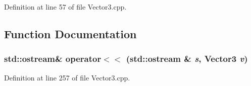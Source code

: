 Definition at line 57 of file Vector3.cpp.



\subsection{Function Documentation}
\subsubsection[{operator$<$$<$}]{\setlength{\rightskip}{0pt plus 5cm}std::ostream\& operator$<$$<$ (std::ostream \& {\em s}, \/  {\bf Vector3} {\em v})}\label{Vector3_8cpp_a751d7222f22f7264709359319164fdcd}


Definition at line 257 of file Vector3.cpp.

